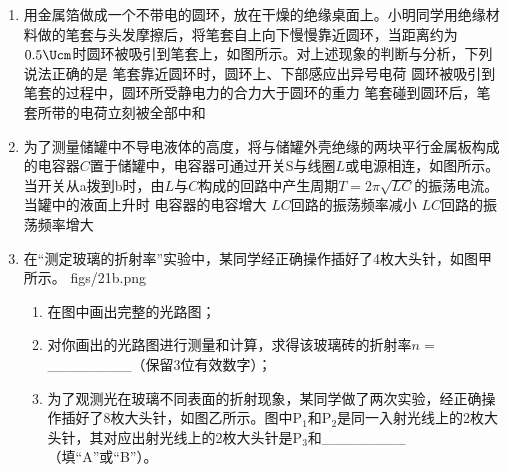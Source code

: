 \documentclass[\gkver]{gaokaozhenti}
\begin{document}
\begin{enumerate}
\item
用金属箔做成一个不带电的圆环，放在干燥的绝缘桌面上。小明同学用绝缘材料做的笔套与头发摩擦后，将笔套自上向下慢慢靠近圆环，当距离约为$0.5\Ucm$时圆环被吸引到笔套上，如图所示。对上述现象的判断与分析，下列说法正确的是
{笔套靠近圆环时，圆环上、下部感应出异号电荷}
{圆环被吸引到笔套的过程中，圆环所受静电力的合力大于圆环的重力}
{笔套碰到圆环后，笔套所带的电荷立刻被全部中和}

\item
为了测量储罐中不导电液体的高度，将与储罐外壳绝缘的两块平行金属板构成的电容器$C$置于储罐中，电容器可通过开关S与线圈$L$或电源相连，如图所示。当开关从a拨到b时，由$L$与$C$构成的回路中产生周期$T=2\pi\sqrt {LC} $的振荡电流。当罐中的液面上升时
{电容器的电容增大}
{$LC$回路的振荡频率减小}
{$LC$回路的振荡频率增大}

\item
在“测定玻璃的折射率”实验中，某同学经正确操作插好了4枚大头针，如图甲所示。
{figs/21b.png}
\begin{enumerate}
	\item
	在图中画出完整的光路图；
	\item
	对你画出的光路图进行测量和计算，求得该玻璃砖的折射率$n=$\_\_\_\_\_\_\_\_（保留3位有效数字）；
	\item
	为了观测光在玻璃不同表面的折射现象，某同学做了两次实验，经正确操作插好了8枚大头针，如图乙所示。图中P$_{1}$和P$_{2}$是同一入射光线上的2枚大头针，其对应出射光线上的2枚大头针是P$_{3}$和\_\_\_\_\_\_\_\_（填“A”或“B”）。
\end{enumerate}
\end{enumerate}
\end{document}
